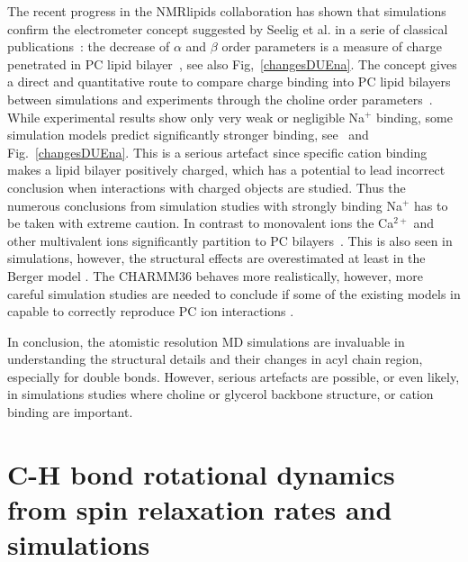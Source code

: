 \documentclass[aps,prl,superscriptaddress,twocolumn]{revtex4}
\begin{document}
The recent progress in the NMRlipids collaboration has shown that simulations confirm the electrometer 
concept suggested by Seelig et al. in a serie of classical publications~\cite{??}: 
the decrease of $\alpha$ and $\beta$ order parameters is a measure of 
charge penetrated in PC lipid bilayer~\cite{ionpaper}, see also Fig,~\ref{changesDUEna}. The concept gives a 
direct and quantitative route to compare charge binding into PC lipid bilayers between simulations
and experiments through the choline order parameters~\cite{ionpaper}. While experimental results show 
only very weak or negligible Na$^{+}$ binding, some simulation models predict significantly stronger
binding, see~\cite{ionpaper} and Fig.~\ref{changesDUEna}. This is a serious artefact since specific cation binding 
makes a lipid bilayer positively charged, which has a potential to lead incorrect conclusion when interactions with
charged objects are studied. Thus the numerous conclusions from simulation studies with strongly binding 
Na$^{+}$ has to be taken with extreme caution. In contrast to monovalent ions the Ca$^{2+}$ and other multivalent ions
significantly partition to PC bilayers~\cite{??}. This is also seen in simulations, however, the structural
effects are overestimated at least in the Berger model \cite{ionpaper}. The CHARMM36 behaves more realistically, 
however, more careful simulation studies are needed to conclude if some of the existing models in capable to correctly
reproduce PC ion interactions \cite{ionpaper}. 

In conclusion, the atomistic resolution MD simulations are invaluable in understanding the 
structural details and their changes in acyl chain region, especially for double bonds.
However, serious artefacts are possible, or even likely, in simulations studies where choline or
glycerol backbone structure, or cation binding are important.


\section{C-H bond rotational dynamics from spin relaxation rates and simulations}


\end{document}
